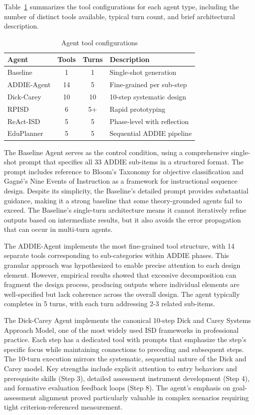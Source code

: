 Table~\ref{tab:agent-tools} summarizes the tool configurations for each agent type, including the number of distinct tools available, typical turn count, and brief architectural description.

\begin{table}[ht!]
\centering
\small
\caption{Agent tool configurations}
\label{tab:agent-tools}
\begin{tabular}{lccp{3.5cm}}
\toprule
\textbf{Agent} & \textbf{Tools} & \textbf{Turns} & \textbf{Description} \\
\midrule
Baseline & 1 & 1 & Single-shot generation \\
ADDIE-Agent & 14 & 5 & Fine-grained per sub-step \\
Dick-Carey & 10 & 10 & 10-step systematic design \\
RPISD & 6 & 5+ & Rapid prototyping \\
ReAct-ISD & 5 & 5 & Phase-level with reflection \\
EduPlanner & 5 & 5 & Sequential ADDIE pipeline \\
\bottomrule
\end{tabular}
\end{table}

The Baseline Agent serves as the control condition, using a comprehensive single-shot prompt that specifies all 33 ADDIE sub-items in a structured format. The prompt includes reference to Bloom's Taxonomy for objective classification and Gagn\'e's Nine Events of Instruction as a framework for instructional sequence design. Despite its simplicity, the Baseline's detailed prompt provides substantial guidance, making it a strong baseline that some theory-grounded agents fail to exceed. The Baseline's single-turn architecture means it cannot iteratively refine outputs based on intermediate results, but it also avoids the error propagation that can occur in multi-turn agents.

The ADDIE-Agent implements the most fine-grained tool structure, with 14 separate tools corresponding to sub-categories within ADDIE phases. This granular approach was hypothesized to enable precise attention to each design element. However, empirical results showed that excessive decomposition can fragment the design process, producing outputs where individual elements are well-specified but lack coherence across the overall design. The agent typically completes in 5 turns, with each turn addressing 2-3 related sub-items.

The Dick-Carey Agent implements the canonical 10-step Dick and Carey Systems Approach Model, one of the most widely used ISD frameworks in professional practice. Each step has a dedicated tool with prompts that emphasize the step's specific focus while maintaining connections to preceding and subsequent steps. The 10-turn execution mirrors the systematic, sequential nature of the Dick and Carey model. Key strengths include explicit attention to entry behaviors and prerequisite skills (Step 3), detailed assessment instrument development (Step 4), and formative evaluation feedback loops (Step 8). The agent's emphasis on goal-assessment alignment proved particularly valuable in complex scenarios requiring tight criterion-referenced measurement.

